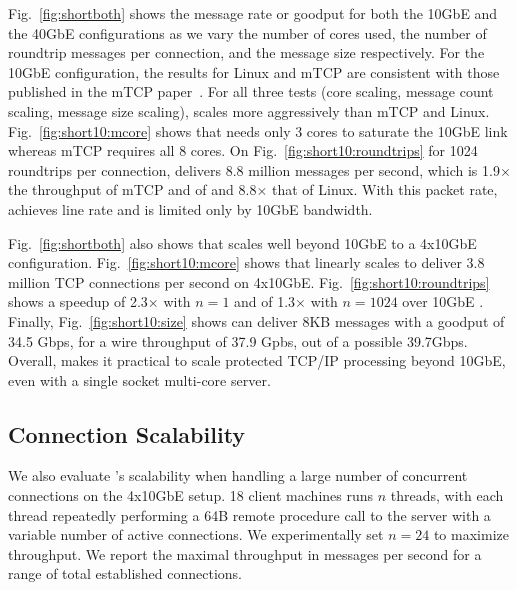 


Fig.~\ref{fig:shortboth} shows the message
rate or goodput for both the 10GbE and the 40GbE configurations as we
vary the number of cores used, the number of roundtrip messages per
connection, and the message size respectively.  For the 10GbE
configuration, the results for Linux and mTCP are consistent with
those published in the mTCP paper~\cite{jeong2014mtcp}.  For all three
tests (core scaling, message count scaling, message size scaling), \ix
scales more aggressively than mTCP and
Linux. Fig.~\ref{fig:short10:mcore} shows that \ix needs only 3 cores
to saturate the 10GbE link whereas mTCP requires all 8 cores. On
Fig.~\ref{fig:short10:roundtrips} for 1024 roundtrips per connection,
\ix delivers 8.8 million messages per second, which is
1.9$\times$ the throughput of mTCP and of and 8.8$\times$ that of
Linux. With this packet rate, \ix achieves line rate and is limited
only by 10GbE bandwidth.





Fig.~\ref{fig:shortboth} also shows that \ix
scales well beyond 10GbE to a 4x10GbE configuration.
Fig.~\ref{fig:short10:mcore} shows that \ix linearly scales to deliver
3.8 million TCP connections per second on 4x10GbE.
Fig.~\ref{fig:short10:roundtrips} shows a speedup of 2.3$\times$ with $n=1$
and of 1.3$\times$ with $n=1024$ over 10GbE \ix.  Finally,
Fig.~\ref{fig:short10:size} shows \ix can deliver 8KB messages with a
goodput of 34.5 Gbps, for a wire throughput of
37.9 Gpbs, out of a possible 39.7Gbps.  Overall, \ix makes
it practical to scale protected TCP/IP processing beyond 10GbE, even
with a single socket multi-core server.



\subsection{Connection Scalability}
\label{sec:eval:scale}



We also evaluate \ix's scalability when handling a large number of
concurrent connections on the 4x10GbE setup. 18 client
machines runs $n$ threads, with each thread repeatedly performing a
64B remote procedure call to the server with a variable number of
active connections. %
We experimentally set $n=24$ to maximize
throughput.  We report the maximal throughput in messages per second
for a range of total established connections.

